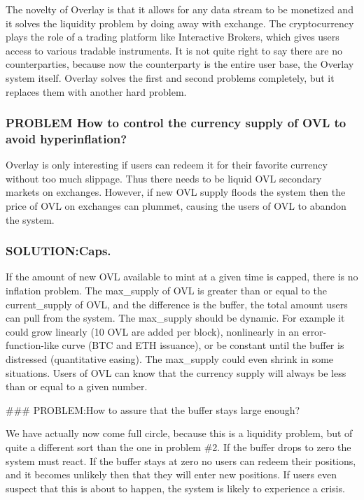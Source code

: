 \documentclass[11pt]{article}
\begin{document}
The novelty of Overlay is that it allows for any data stream to be
monetized and it solves the liquidity problem by doing away with
exchange. The cryptocurrency plays the role of a trading platform like
Interactive Brokers, which gives users access to various tradable
instruments. It is not quite right to say there are no counterparties,
because now the counterparty is the entire user base, the Overlay system
itself. Overlay solves the first and second problems completely, but it
replaces them with another hard problem.

    \subsubsection{\texorpdfstring{PROBLEM How to control the currency
supply of OVL to avoid
hyperinflation?}{PROBLEM  How to control the currency supply of OVL to avoid hyperinflation?}}\label{problem-how-to-control-the-currency-supply-of-ovl-to-avoid-hyperinflation}

Overlay is only interesting if users can redeem it for their favorite
currency without too much slippage. Thus there needs to be liquid OVL
secondary markets on exchanges. However, if new OVL supply floods the
system then the price of OVL on exchanges can plummet, causing the users
of OVL to abandon the system.

    \subsubsection{\texorpdfstring{SOLUTION:Caps.}{SOLUTION: Caps.}}\label{solution-caps.}

If the amount of new OVL available to mint at a given time is capped,
there is no inflation problem. The max\_supply of OVL is greater than or
equal to the current\_supply of OVL, and the difference is the buffer,
the total amount users can pull from the system. The max\_supply should
be dynamic. For example it could grow linearly (10 OVL are added per
block), nonlinearly in an error-function-like curve (BTC and ETH
issuance), or be constant until the buffer is distressed (quantitative
easing). The max\_supply could even shrink in some situations. Users of
OVL can know that the currency supply will always be less than or equal
to a given number.

    \#\#\# PROBLEM:How to assure that the buffer stays large enough?

We have actually now come full circle, because this is a liquidity
problem, but of quite a different sort than the one in problem \#2. If
the buffer drops to zero the system must react. If the buffer stays at
zero no users can redeem their positions, and it becomes unlikely then
that they will enter new positions. If users even suspect that this is
about to happen, the system is likely to experience a crisis.
\end{document}
